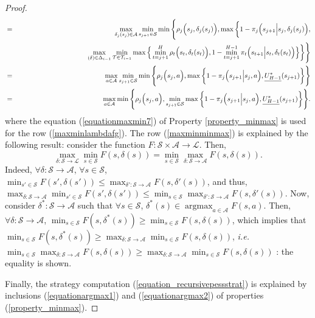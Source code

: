 \begin{proof}
\begin{eqnarray}
\label{maxminminmax} & = &  \displaystyle \max_{\delta_j(s_j) \in \mathcal{A}} \min_{s_{j+1} \in \mathcal{S}} \min \Bigg\{ \rho_j \Big( s_j,\delta_j(s_j) \Big), \max \bigg\{ 1 - \pi_j \Big( s_{j+1} \Big\vert s_j, \delta_j(s_j) \Big), \\ 
\nonumber & & \hspace{3.5cm} \max_{(\delta) \in \Delta_{i-1}} \min_{\mathcal{T} \in \mathcal{T}_{i-1}} \max \Big\{  \min_{t=j+1}^{H} \rho_t \Big( s_t,\delta_t(s_t) \Big), 1- \min_{t=j+1}^{H-1} \pi_t \Big( s_{t+1} \Big\vert s_t , \delta_t(s_t) \Big) \Big\} \bigg\} \Bigg\} \\
\nonumber & = &  \displaystyle \max_{a \in \mathcal{A}} \min_{s_{j+1} \in \mathcal{S}} \min \Bigg\{ \rho_j \Big(s_j,a \Big), \max \bigg\{ 1 - \pi_j \Big( s_{j+1} \Big\vert s_j, a \Big),\underline{U^*_{H-1}}(s_{j+1}) \bigg\} \Bigg\} \\
\nonumber & = &  \displaystyle \max_{a \in \mathcal{A}} \min \Bigg\{ \rho_j \Big(s_j,a\Big), \min_{s_{j+1} \in \mathcal{S}} \max \bigg\{ 1 - \pi_j \Big( s_{j+1} \Big\vert s_j, a \Big),\underline{U^*_{H-1}}(s_{j+1}) \bigg\} \Bigg\} .
\end{eqnarray}
where the equation (\ref{equationmaxmin7}) of Property \ref{property_minmax} is used for the row (\ref{maxminlambdafg}).
The row (\ref{maxminminmax}) is explained by the following result:
consider the function $F: \mathcal{S} \times \mathcal{A} \rightarrow \mathcal{L}$.
Then,
\[ \max_{\delta: \mathcal{S} \rightarrow \mathcal{L}} \min_{s\in \mathcal{S}} F(s,\delta(s)) = \min_{s \in \mathcal{S}} \max_{\delta: \mathcal{S} \rightarrow \mathcal{A}} F(s, \delta(s)). \]
Indeed, $\forall \delta: \mathcal{S} \rightarrow \mathcal{A}$, $\forall s \in \mathcal{S}$,
$\displaystyle \min_{s' \in \mathcal{S}} F(s',\delta(s')) \leqslant \max_{\delta': \mathcal{S} \rightarrow \mathcal{A}} F(s,\delta'(s))$,
and thus, $\displaystyle \max_{\delta: \mathcal{S} \rightarrow \mathcal{A}} \min_{s' \in \mathcal{S}} F(s',\delta(s')) \leqslant \min_{s \in \mathcal{S}} \max_{\delta': \mathcal{S} \rightarrow \mathcal{A}} F(s,\delta'(s))$.
Now, consider $\delta^*: \mathcal{S} \rightarrow \mathcal{A}$
such that $\forall s \in \mathcal{S}$, $\delta^*(s) \in \operatorname*{argmax}_{a \in \mathcal{A}} F(s,a)$.
Then, $\forall \delta: \mathcal{S} \rightarrow \mathcal{A}$,
$\displaystyle \min_{s \in \mathcal{S}} F(s,\delta^*(s)) \geqslant \min_{s \in \mathcal{S}} F(s, \delta(s))$,
which implies that $\displaystyle \min_{s \in \mathcal{S}} F(s,\delta^*(s)) \geqslant \max_{\delta: \mathcal{S} \rightarrow \mathcal{A}} \min_{s \in \mathcal{S}} F(s, \delta(s))$,
\textit{i.e.} $\displaystyle \min_{s \in \mathcal{S}} \max_{\delta: \mathcal{S} \rightarrow \mathcal{A}} F(s,\delta(s)) \geqslant \max_{\delta: \mathcal{S} \rightarrow \mathcal{A}} \min_{s \in \mathcal{S}} F(s, \delta(s))$
: the equality is shown.

Finally, the strategy computation (\ref{equation_recursivepessstrat})
is explained by inclusions (\ref{equationargmax1}) and (\ref{equationargmax2})
of properties (\ref{property_minmax}).
\end{proof}







